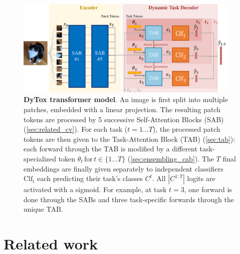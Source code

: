\begin{figure}
    \centering
    \includegraphics[width=0.95\textwidth]{images/dytox/dytox.pdf}
    \caption{\textbf{DyTox transformer model}. An image is first split into multiple patches,
    embedded with a linear projection. The resulting patch tokens are processed by 5 successive
    Self-Attention Blocks (SAB) (\autoref{sec:related_cv}). For each task ($t = 1\dots T$), the processed
    patch tokens are then given to the Task-Attention Block (TAB) (\autoref{sec:tab}): each forward
    through the TAB is modified by a different task-specialized token $\theta_t\, \text{for}\, t \in
        \{1 \dots T\}$ (\autoref{sec:ensembling_cab}). The $T$ final embeddings are finally given
    separately to independent classifiers $\text{Clf}_t$ each predicting their task's classes $C^t$.
    All $|C^{1:T}|$ logits are activated with a sigmoid. For example, at task $t=3$, one forward is
    done through the SABs and three task-specific forwards through the unique TAB.}
    \label{fig:dytox_model}
\end{figure}


\section{Related work}
\label{sec:dytox_related}

